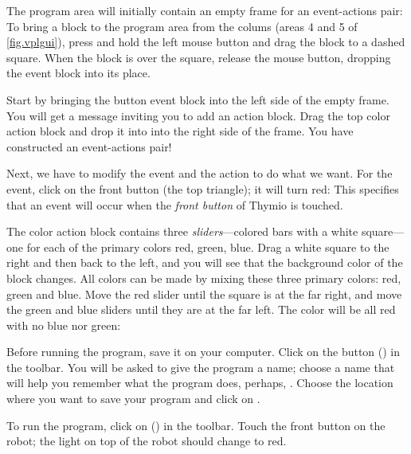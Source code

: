 The program area will initially contain an empty frame for an
event-actions pair:  To bring a block to the program
area from the colums (areas 4 and 5 of \cref{fig.vplgui}), press and
hold the left mouse button and drag the block to a dashed square. When the
block is over the square, release the mouse button, dropping the event block
into its place.


Start by bringing the button event block  into the
left side of the empty frame. You will get a message inviting you to add
an action block. Drag the top color action block
 and drop it into into the right side of the frame. You have
constructed an event-actions pair!

Next, we have to modify the event and the action to do what we want. For
the event, click on the front button (the top triangle); it will turn
red:  This specifies that an event will occur when the
\textit{front button} of Thymio is touched.

The color action block contains three \emph{sliders}---colored bars with
a white square---one for each of the primary colors red, green, blue.
Drag a white square to the right and then back to the left, and you will
see that the background color of the block changes. All colors can be
made by mixing these three primary colors: red, green and blue. Move
the red slider until the square is at the far right, and move the green
and blue sliders until they are at the far left. The color will be all
red with no blue nor green: 


Before running the program, save it on your computer. Click on the
button  () in the toolbar. You will be asked to
give the program a name; choose a name that will help you remember what
the program does, perhaps, . Choose the location where
you want to save your program and click on .





To run the program, click on  () in the toolbar.
Touch the front button on the robot; the light on top of the robot
should change to red.

